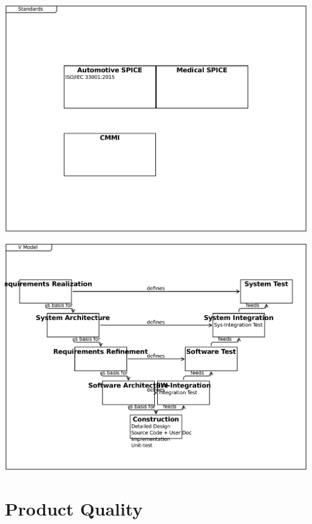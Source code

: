 \documentclass{article}
\begin{document}
\includegraphics[width= 1.0\linewidth]{quality_export/6_Standards.pdf}


\includegraphics[width= 1.0\linewidth]{quality_export/9_V_Model.pdf}


\section{Product Quality}
\end{document}
